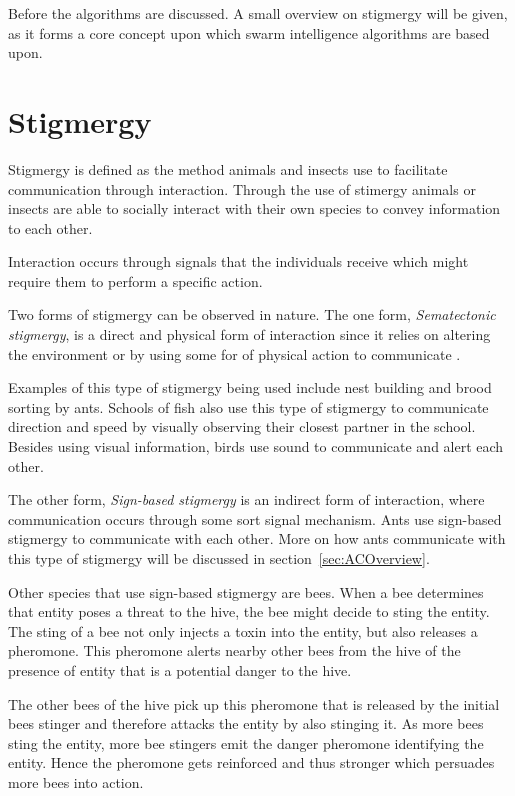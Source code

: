 Before the algorithms are discussed. A small overview on stigmergy will be given, as it forms a core concept upon which swarm intelligence algorithms are based upon.
\section{Stigmergy}
\label{sec:stigmergy}
Stigmergy is defined as the method animals and insects use to facilitate communication through interaction. Through the use of stimergy animals or insects are able to socially interact with their own species to convey information to each other.

Interaction occurs through signals that the individuals receive which might require them to perform a specific action\cite{AntsAndStigmergy,CompuIntelligenceIntro,AntIntroTrends}.

Two forms of stigmergy can be observed in nature. The one form, \emph{Sematectonic stigmergy}\label{def:sematectonic}, is a direct and physical form of interaction since it relies on altering the environment or by using some for of physical action to communicate \cite{CompuIntelligenceIntro}. 

Examples of this type of stigmergy being used include nest building and brood sorting by ants\cite{CompuIntelligenceIntro}. Schools of fish also use this type of stigmergy to communicate direction and speed by visually observing their closest partner in the school. Besides using visual information, birds use sound to communicate and alert each other\cite{SwarmArt}.

The other form, \emph{Sign-based stigmergy} is an indirect form of interaction, where communication occurs through some sort signal mechanism\cite{CompuIntelligenceIntro}. Ants use sign-based stigmergy to communicate with each other. More on how ants communicate with this type of stigmergy will be discussed in section~\ref{sec:ACOverview}.

Other species that use sign-based stigmergy are bees\cite{stigmergicoptimization}. When a bee determines that entity poses a threat to the hive, the bee might decide to sting the entity. The sting of a bee not only injects a toxin into the entity, but also releases a pheromone\cite{stigmergicoptimization}. This pheromone alerts nearby other bees from the hive of the presence of entity that is a potential danger to the hive\cite{stigmergicoptimization}. 

The other bees of the hive pick up this pheromone that is released by the initial bees stinger and therefore attacks the entity by also stinging it\cite{stigmergicoptimization}. As more bees sting the entity, more bee stingers emit the danger pheromone identifying the entity\cite{stigmergicoptimization}. Hence the pheromone gets reinforced and thus stronger which persuades more bees into action\cite{stigmergicoptimization}.


